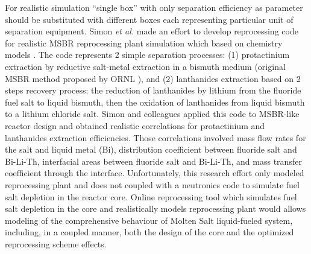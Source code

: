 For realistic simulation ``single box'' with only separation efficiency as parameter
 should be substituted with different boxes each representing particular unit of
separation equipment. Simon \emph{et al.} made an effort to develop reprocessing code for realistic \gls{MSBR} reprocessing plant simulation 
which based on chemistry models \cite{simon_-line_2008}. The code represents 2 simple separation processes: (1)  protactinium 
extraction by reductive salt-metal extraction in a bismuth medium (original 
\gls{MSBR} method proposed by \gls{ORNL} \cite{whatley_engineering_1970-1}), and (2) 
lanthanides extraction based on 2 steps recovery process:  the reduction of 
lanthanides by lithium from the fluoride fuel salt to liquid bismuth, then the 
oxidation of lanthanides from liquid bismuth to a lithium chloride salt. Simon and 
colleagues applied this code to \gls{MSBR}-like reactor design and obtained realistic 
correlations for protactinium and lanthanides extraction efficiencies. Those 
correlations involved mass flow rates for the salt and liquid metal (Bi), 
distribution coefficient between fluoride salt and Bi-Li-Th, interfacial areas 
between fluoride salt and Bi-Li-Th, and mass transfer coefficient through the 
interface. Unfortunately, this research effort only modeled reprocessing plant 
and does not coupled with a neutronics code to simulate fuel salt depletion in 
the reactor core. Online reprocessing 
tool which simulates fuel salt depletion in the core and realistically models 
reprocessing plant would allows modeling of the comprehensive behaviour of 
Molten Salt liquid-fueled system, including, in a coupled manner, both the 
design of the core and the optimized reprocessing scheme effects.
